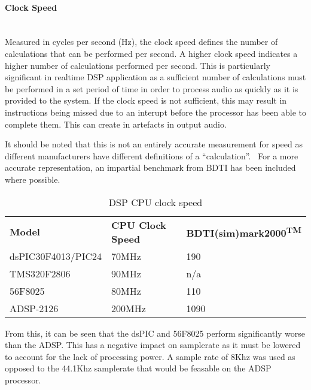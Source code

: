 \documentclass[titlepage]{scrartcl}
\begin{document}
    \paragraph{Clock Speed}~\\
    Measured in cycles per second (Hz), the clock speed defines the number of
    calculations that can be performed per second. A higher clock speed
    indicates a higher number of calculations performed per second. This is
    particularly significant in realtime DSP application as a sufficient number
    of calculations must be performed in a set period of time in order to
    process audio as quickly as it is provided to the system.  If the clock
    speed is not sufficient, this may result in instructions being missed due
    to an interupt before the processor has been able to complete them. This
    can create in artefacts in output audio.~\parencite[p.34]{sd2006mfes}

    It should be noted that this is not an entirely accurate measurement for
    speed as different manufacturers have different definitions of a
    ``calculation''.~\parencite[p.3-4]{bdti2000cdp} For a more accurate
    representation, an impartial benchmark from BDTI has been included where
    possible.~\parencite[p.1]{bdti2013pg}
    \begin{table}[H]
    \centering
    \caption{DSP CPU clock speed}
    \label{my-label}
    \begin{tabular}{lll}
        \textbf{Model}              & \textbf{CPU Clock Speed}
                                    &\textbf{BDTI(sim)mark2000\textsuperscript{TM}}\\
        dsPIC30F4013/PIC24 & 70MHz              & 190\\
        TMS320F2806        & 90MHz              & n/a\\
        56F8025            & 80MHz              & 110\\
        ADSP-2126          & 200MHz             & 1090\\
    \end{tabular}
    \end{table}
    From this, it can be seen that the dsPIC and 56F8025 perform significantly
    worse than the ADSP. This has a negative impact on samplerate as it must be
    lowered to account for the lack of processing power. A sample rate of 8Khz
    was used as opposed to the 44.1Khz samplerate that would be feasable on the
    ADSP processor.
\end{document}
